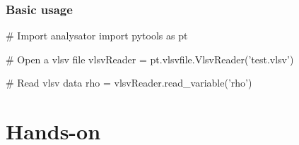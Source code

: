 \documentclass{beamer}
\begin{document}
\begin{frame}[fragile]
 \frametitle{Basic usage}
 \begin{python}[basicstyle=\tiny]
  # Import analysator
  import pytools as pt
  
  # Open a vlsv file
  vlsvReader = pt.vlsvfile.VlsvReader('test.vlsv')
  
  # Read vlsv data
  rho = vlsvReader.read_variable('rho')
  
 \end{python}

\end{frame}


\section{Hands-on}
\end{document}
